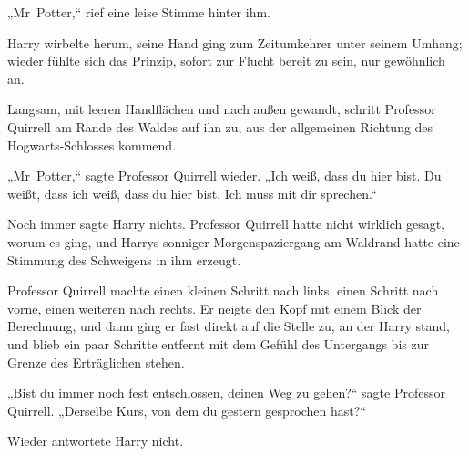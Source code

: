 „Mr~Potter,“ rief eine leise Stimme hinter ihm.

Harry wirbelte herum, seine Hand ging zum Zeitumkehrer unter seinem Umhang; wieder fühlte sich das Prinzip, sofort zur Flucht bereit zu sein, nur gewöhnlich an.

Langsam, mit leeren Handflächen und nach außen gewandt, schritt Professor Quirrell am Rande des Waldes auf ihn zu, aus der allgemeinen Richtung des Hogwarts-Schlosses kommend.

„Mr~Potter,“ sagte Professor Quirrell wieder. „Ich weiß, dass du hier bist. Du weißt, dass ich weiß, dass du hier bist. Ich muss mit dir sprechen.“

Noch immer sagte Harry nichts. Professor Quirrell hatte nicht wirklich gesagt, worum es ging, und Harrys sonniger Morgenspaziergang am Waldrand hatte eine Stimmung des Schweigens in ihm erzeugt.

Professor Quirrell machte einen kleinen Schritt nach links, einen Schritt nach vorne, einen weiteren nach rechts. Er neigte den Kopf mit einem Blick der Berechnung, und dann ging er fast direkt auf die Stelle zu, an der Harry stand, und blieb ein paar Schritte entfernt mit dem Gefühl des Untergangs bis zur Grenze des Erträglichen stehen.

„Bist du immer noch fest entschlossen, deinen Weg zu gehen?“ sagte Professor Quirrell. „Derselbe Kurs, von dem du gestern gesprochen hast?“

Wieder antwortete Harry nicht.

